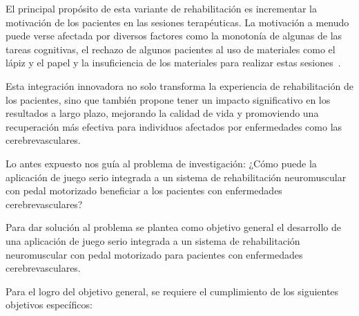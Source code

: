 \begin{introduction}
    \vspace{5pt} El principal propósito de esta variante de rehabilitación es incrementar la motivación de los pacientes en las sesiones terapéuticas. La motivación a menudo puede verse afectada por diversos factores como la monotonía de algunas de las tareas cognitivas, el rechazo de algunos pacientes al uso de materiales como el lápiz y el papel y la insuficiencia de los materiales para realizar estas sesiones~\cite{regalon12019juegos}. 
    
    \vspace{5pt} Esta integración innovadora no solo transforma la experiencia de rehabilitación de los pacientes, sino que también propone tener un impacto significativo en los resultados a largo plazo, mejorando la calidad de vida y promoviendo una recuperación más efectiva para individuos afectados por enfermedades como las cerebrevasculares.

    \vspace{5pt}

    Lo antes expuesto nos guía al problema de investigación: ¿Cómo puede la aplicación de juego serio integrada a un sistema de rehabilitación neuromuscular con pedal motorizado beneficiar a los pacientes con enfermedades cerebrevasculares?

    \vspace{5pt}
    Para dar solución al problema se plantea como objetivo general el desarrollo de una aplicación de juego serio integrada a un sistema de rehabilitación neuromuscular con pedal motorizado para pacientes con enfermedades cerebrevasculares.
    
    \vspace{5pt}
    Para el logro del objetivo general, se requiere el cumplimiento de los siguientes objetivos específicos:


\end{introduction}
